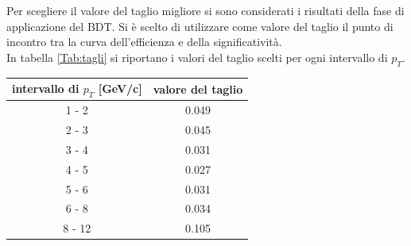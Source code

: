 Per scegliere il valore del taglio migliore si sono considerati i risultati della fase di applicazione del BDT. Si è scelto di utilizzare come valore del taglio il punto di incontro tra la curva dell'efficienza e della significatività.
\\In tabella \ref{Tab:tagli} si riportano i valori del taglio scelti per ogni intervallo di $p_T$.

\begin{table}[H]
		\centering
		\begin{tabular}{c|c}
		    \toprule
		    intervallo di $p_T$ [GeV/c]  &  valore del taglio  \\
            \midrule
           	1 - 2  	&    0.049   \\ 
            2 - 3 	&    0.045  \\ 
            3 - 4  	&    0.031  \\ 
            4 - 5  	&    0.027  \\ 
            5 - 6  	&    0.031  \\ 
            6 - 8  	&    0.034  \\ 
            8 - 12  &    0.105  \\   
			\bottomrule
		\end{tabular}
	\end{table}


  
  
  
